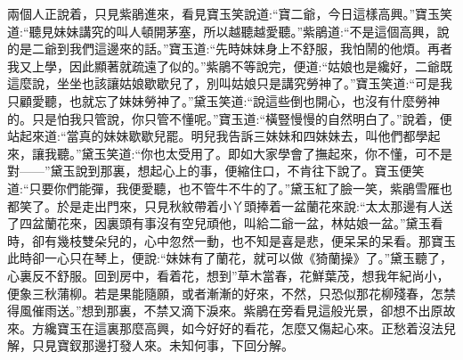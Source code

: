 \begin{parag}
    兩個人正說着，只見紫鵑進來，看見寶玉笑說道:“寶二爺，今日這樣高興。”寶玉笑道:“聽見妹妹講究的叫人頓開茅塞，所以越聽越愛聽。”紫鵑道:“不是這個高興，說的是二爺到我們這邊來的話。”寶玉道:“先時妹妹身上不舒服，我怕鬧的他煩。再者我又上學，因此顯著就疏遠了似的。”紫鵑不等說完，便道:“姑娘也是纔好，二爺既這麼說，坐坐也該讓姑娘歇歇兒了，別叫姑娘只是講究勞神了。”寶玉笑道:“可是我只顧愛聽，也就忘了妹妹勞神了。”黛玉笑道:“說這些倒也開心，也沒有什麼勞神的。只是怕我只管說，你只管不懂呢。”寶玉道:“橫豎慢慢的自然明白了。”說着，便站起來道:“當真的妹妹歇歇兒罷。明兒我告訴三妹妹和四妹妹去，叫他們都學起來，讓我聽。”黛玉笑道:“你也太受用了。即如大家學會了撫起來，你不懂，可不是對——”黛玉說到那裏，想起心上的事，便縮住口，不肯往下說了。寶玉便笑道:“只要你們能彈，我便愛聽，也不管牛不牛的了。”黛玉紅了臉一笑，紫鵑雪雁也都笑了。於是走出門來，只見秋紋帶着小丫頭捧着一盆蘭花來說:“太太那邊有人送了四盆蘭花來，因裏頭有事沒有空兒頑他，叫給二爺一盆，林姑娘一盆。”黛玉看時，卻有幾枝雙朵兒的，心中忽然一動，也不知是喜是悲，便呆呆的呆看。那寶玉此時卻一心只在琴上，便說:“妹妹有了蘭花，就可以做《猗蘭操》了。”黛玉聽了，心裏反不舒服。回到房中，看着花，想到”草木當春，花鮮葉茂，想我年紀尚小，便象三秋蒲柳。若是果能隨願，或者漸漸的好來，不然，只恐似那花柳殘春，怎禁得風催雨送。”想到那裏，不禁又滴下淚來。紫鵑在旁看見這般光景，卻想不出原故來。方纔寶玉在這裏那麼高興，如今好好的看花，怎麼又傷起心來。正愁着沒法兒解，只見寶釵那邊打發人來。未知何事，下回分解。
\end{parag}